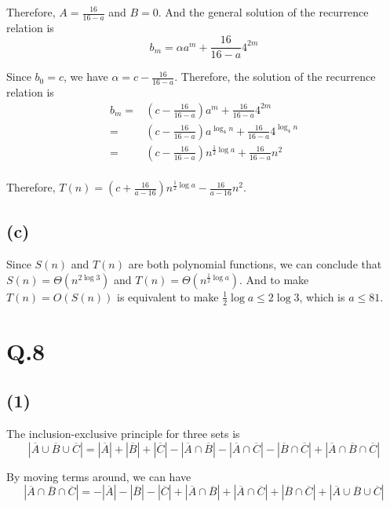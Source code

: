 \documentclass[a4paper,12pt]{article}
\begin{document}
Therefore, $A = \frac{16}{16 - a}$ and $B = 0$.
And the general solution of the recurrence relation is
\begin{equation*}
	b_m = \alpha a^m + \frac{16}{16 - a} 4^{2m}
\end{equation*}

Since $b_0 = c$, we have $\alpha = c - \frac{16}{16 - a}$.
Therefore, the solution of the recurrence relation is
\begin{align*}
	b_m =& \left(c - \frac{16}{16 - a}\right) a^m + \frac{16}{16 - a} 4^{2m} \\
	=& \left(c - \frac{16}{16 - a}\right) a^{\log_4 n} + \frac{16}{16 - a} 4^{\log_4 n} \\
	=& \left(c - \frac{16}{16 - a}\right) n^{\frac{1}{2} \log a} + \frac{16}{16 - a} n^2 \\
\end{align*}

Therefore, $T(n) = \left(c + \frac{16}{a - 16}\right) n^{\frac{1}{2} \log a} - \frac{16}{a - 16} n^2$.

\subsection*{(c)}

Since $S(n)$ and $T(n)$ are both polynomial functions, we can conclude that $S(n) = \Theta(n^{2\log 3})$ and $T(n) = \Theta(n^{\frac{1}{2} \log a})$.
And to make $T(n) = O(S(n))$ is equivalent to make $\frac{1}{2} \log a \leq 2\log 3$, which is $a \leq 81$.

\section*{Q.8}

\subsection*{(1)}

The inclusion-exclusive principle for three sets is
\begin{equation*}
	|\overline{A} \cup \overline{B} \cup \overline{C}| = |\overline{A}| + |\overline{B}| + |\overline{C}| - |\overline{A} \cap \overline{B}| - |\overline{A} \cap \overline{C}| - |\overline{B} \cap \overline{C}| + |\overline{A} \cap \overline{B} \cap \overline{C}|
\end{equation*}

By moving terms around, we can have
\begin{equation*}
	|\overline{A} \cap \overline{B} \cap \overline{C}| = - |\overline{A}| - |\overline{B}| - |\overline{C}| + |\overline{A} \cap \overline{B}| + |\overline{A} \cap \overline{C}| + |\overline{B} \cap \overline{C}| + |\overline{A} \cup \overline{B} \cup \overline{C}|
\end{equation*}
\end{document}
